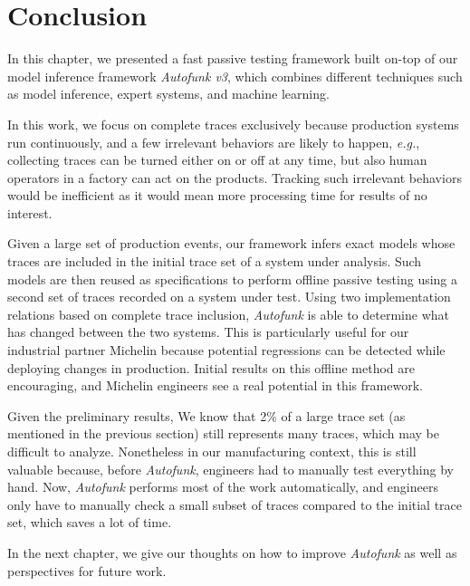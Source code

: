 \section{Conclusion}
\label{sec:testing:conclusion}

In this chapter, we presented a fast passive testing framework
built on-top of our model inference framework \emph{Autofunk v3},
which combines different techniques such as model inference,
expert systems, and machine learning.

In this work, we focus on complete traces exclusively because
production systems run continuously, and a few irrelevant
behaviors are likely to happen, \emph{e.g.}, collecting traces
can be turned either on or off at any time, but also human
operators in a factory can act on the products. Tracking such
irrelevant behaviors would be inefficient as it would mean more
processing time for results of no interest.

Given a large set of production events, our framework infers
exact models whose traces are included in the initial trace set
of a system under analysis. Such models are then reused as
specifications to perform offline passive testing using a second
set of traces recorded on a system under test. Using two
implementation relations based on complete trace inclusion,
\textit{Autofunk} is able to determine what has changed between
the two systems. This is particularly useful for our industrial
partner Michelin because potential regressions can be detected
while deploying changes in production. Initial results on this
offline method are encouraging, and Michelin engineers see a real
potential in this framework.

Given the preliminary results, We know that 2\% of a large trace
set (as mentioned in the previous section) still represents many
traces, which may be difficult to analyze. Nonetheless in our
manufacturing context, this is still valuable because, before
\emph{Autofunk}, engineers had to manually test everything by
hand. Now, \emph{Autofunk} performs most of the work
automatically, and engineers only have to manually check a small
subset of traces compared to the initial trace set, which saves a
lot of time.

In the next chapter, we give our thoughts on how to improve
\textit{Autofunk} as well as perspectives for future work.
